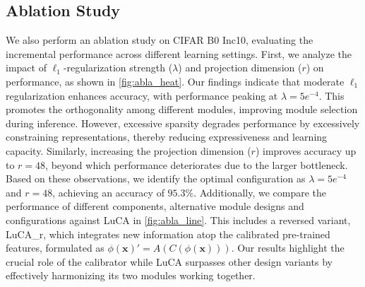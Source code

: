 \subsection{Ablation Study}
We also perform an ablation study on CIFAR B0 Inc10, evaluating the incremental performance across different learning settings. 
First, we analyze the impact of $\ell_1$-regularization strength ($\lambda$) and projection dimension ($r$) on performance, as shown in \cref{fig:abla_heat}.
Our findings indicate that moderate $\ell_1$ regularization enhances accuracy, with performance peaking at $\lambda = 5e^{-4}$. This promotes the orthogonality among different modules, improving module selection during inference. However, excessive sparsity degrades performance by excessively constraining representations, thereby reducing expressiveness and learning capacity. 
Similarly, increasing the projection dimension ($r$) improves accuracy up to $r = 48$, beyond which performance deteriorates due to the larger bottleneck. Based on these observations, we identify the optimal configuration as $\lambda = 5e^{-4}$ and $r = 48$, achieving an accuracy of $95.3\%$.
Additionally, we compare the performance of different components, alternative module designs and configurations against LuCA in \cref{fig:abla_line}. This includes a reversed variant, LuCA\_r, which integrates new information atop the calibrated pre-trained features, formulated as $\phi(\mathbf{x})' = A(C(\phi(\mathbf{x})))$. Our results highlight the crucial role of the calibrator while LuCA surpasses other design variants by effectively harmonizing its two modules working together.
